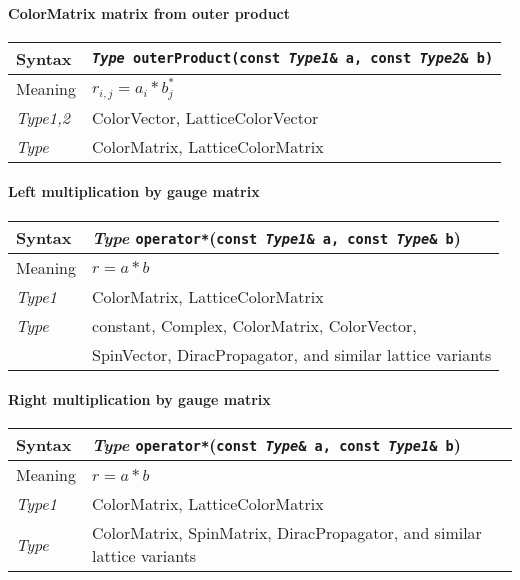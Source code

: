 \documentclass[12pt,letterpaper]{article}
\newcommand{\tConstant}{constant}
\newcommand{\tLatticeColorMatrix}{LatticeColorMatrix}
\newcommand{\tComplex}{Complex}
\newcommand{\tColorMatrix}{ColorMatrix}
\newcommand{\tDiracPropagator}{DiracPropagator}
\newcommand{\tSpinMatrix}{SpinMatrix}
\newcommand{\tSpinVector}{SpinVector}
\newcommand{\tColorVector}{ColorVector}
\newcommand{\tLatticeColorVector}{LatticeColorVector}
\newcommand{\itt}{\it Type}
\newcommand{\protoBinaryQual}[1]{{\tt {\it Type} #1(const {\it Type1}\& a, const {\it Type2}\& b)}}
\begin{document}
\paragraph{ColorMatrix matrix from outer product}

\begin{flushleft}
  \begin{tabular}{|l|l|}
  \hline
  Syntax      & \protoBinaryQual{outerProduct} \\
  \hline
  Meaning     & $r_{i,j} = a_i * b_j^*$ \\
  \hline
  {\it Type1,2} & \tColorVector, \tLatticeColorVector\\
  \itt        & \tColorMatrix, \tLatticeColorMatrix\\
  \hline
  \end{tabular}
\end{flushleft}

\paragraph{Left multiplication by gauge matrix}

\begin{flushleft}
  \begin{tabular}{|l|l|}
  \hline
  Syntax      & {\it Type} \verb|operator*|({\tt const {\it Type1}\& a, const {\it Type}\& b})\\
  \hline
  Meaning     & $r = a * b$ \\
  \hline
  {\it Type1} & \tColorMatrix, \tLatticeColorMatrix\\
  \itt        & \tConstant, \tComplex, \tColorMatrix, \tColorVector, \\
              & \tSpinVector, \tDiracPropagator,
                and similar lattice variants\\
  \hline
  \end{tabular}
\end{flushleft}


\paragraph{Right multiplication by gauge matrix}

\begin{flushleft}
  \begin{tabular}{|l|l|}
  \hline
  Syntax      & {\it Type} \verb|operator*|({\tt const {\it Type}\& a, const {\it Type1}\& b})\\
  \hline
  Meaning     & $r = a * b$ \\
  \hline
  {\it Type1} & \tColorMatrix, \tLatticeColorMatrix\\
  \itt        & \tColorMatrix, \tSpinMatrix, \tDiracPropagator,
                and similar lattice variants\\
  \hline
  \end{tabular}
\end{flushleft}
\end{document}
